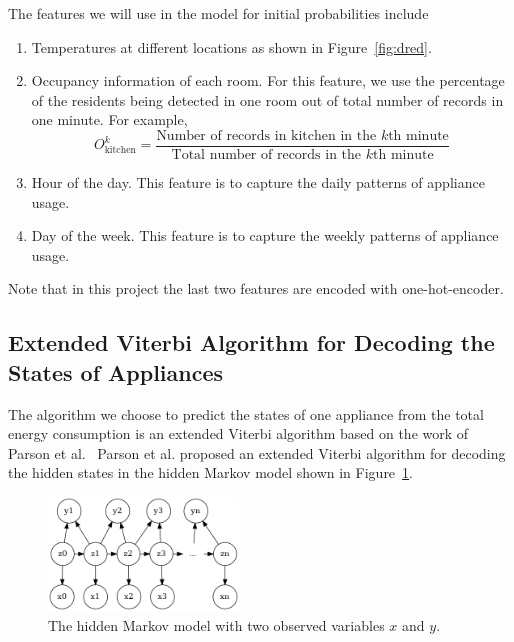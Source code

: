 \documentclass[sigconf]{acmart}
\begin{document}
The features we will use in the model for initial probabilities include
\begin{enumerate}
\item Temperatures at different locations as shown in
  Figure~\ref{fig:dred}.
\item Occupancy information of each room. For this feature, we use the
  percentage of the residents being detected in one room out of total
  number of records in one minute. For example,
  \begin{equation}
    O_{\text{kitchen}}^{k} = \frac{\text{Number of records in kitchen in the
      } k\text{th minute}}{\text{Total number of records in the } k\text{th
        minute}}
    \label{eq:occupancy}
  \end{equation}
\item Hour of the day. This feature is to capture the daily patterns
  of appliance usage.
\item Day of the week. This feature is to capture the weekly patterns
  of appliance usage.
\end{enumerate}

Note that in this project the last two features are encoded with
one-hot-encoder.

\subsection{Extended Viterbi Algorithm for Decoding the States of
  Appliances}

The algorithm we choose to predict the states of one appliance from
the total energy consumption is an extended Viterbi algorithm based on
the work of Parson et al.~\cite{parson2012non} Parson et al.\@
proposed an extended Viterbi algorithm for decoding the hidden states
in the hidden Markov model shown in Figure~\ref{fig:hmm}.

\begin{figure}[ht]
  \centering
  \includegraphics[width=0.45\textwidth]{figures/hmm}
  \caption{\label{fig:hmm} The hidden Markov model with two observed
    variables $x$ and $y$.}
\end{figure}
\end{document}
